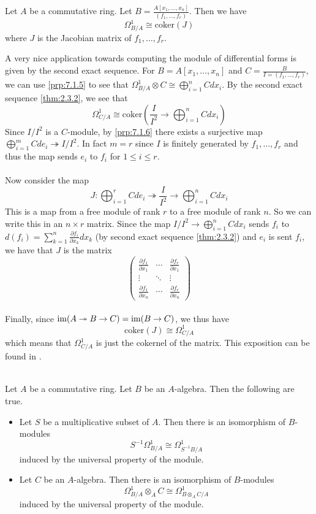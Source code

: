 \documentclass[a4paper]{article}
\begin{document}
\begin{eg}{}{} Let $A$ be a commutative ring. Let $B=\frac{A[x_1,\dots,x_n]}{(f_1,\dots,f_r)}$. Then we have $$\Omega_{B/A}^1\cong\text{coker}(J)$$ where $J$ is the Jacobian matrix of $f_1,\dots,f_r$. 
\end{eg}

A very nice application towards computing the module of differential forms is given by the second exact sequence. For $B=A[x_1,\dots,x_n]$ and $C=\frac{B}{I=(f_1,\dots,f_r)}$, we can use \ref{prp:7.1.5} to see that $\Omega_{B/A}^1\otimes C\cong\bigoplus_{i=1}^nCdx_i$. By the second exact sequence \ref{thm:2.3.2}, we see that $$\Omega_{C/A}^1\cong\text{coker}\left(\frac{I}{I^2}\to\bigoplus_{i=1}^nCdx_i\right)$$ Since $I/I^2$ is a $C$-module, by \ref{prp:7.1.6} there exists a surjective map $\bigoplus_{i=1}^mCde_i\twoheadrightarrow I/I^2$. In fact $m=r$ since $I$ is finitely generated by $f_1,\dots,f_r$ and thus the map sends $e_i$ to $f_i$ for $1\leq i\leq r$. \\~\\

Now consider the map $$J:\bigoplus_{i=1}^rCde_i\twoheadrightarrow\frac{I}{I^2}\rightarrow\bigoplus_{i=1}^nCdx_i$$ This is a map from a free module of rank $r$ to a free module of rank $n$. So we can write this in an $n\times r$ matrix. Since the map $I/I^2\to\bigoplus_{i=1}^nCdx_i$ sends $f_i$ to $d(f_i)=\sum_{k=1}^n\frac{\partial f_i}{\partial x_k}dx_k$ (by second exact sequence \ref{thm:2.3.2}) and $e_i$ is sent $f_i$, we have that $J$ is the matrix $$\begin{pmatrix}
\frac{\partial f_1}{\partial x_1} & \cdots & \frac{\partial f_r}{\partial x_1}\\
\vdots & \ddots & \vdots\\
\frac{\partial f_1}{\partial x_n} & \cdots & \frac{\partial f_r}{\partial x_n}
\end{pmatrix}$$~\\

Finally, since $\operatorname{im}(A\twoheadrightarrow B\to C)=\operatorname{im}(B\to C)$, we thus have $$\text{coker}(J)\cong\Omega_{C/A}^1$$ which means that $\Omega_{C/A}^1$ is just the cokernel of the matrix. This exposition can be found in \cite{Dav}. 

\begin{prp}{}{}\\
Let $A$ be a commutative ring. Let $B$ be an $A$-algebra. Then the following are true. 
\begin{itemize}
\item Let $S$ be a multiplicative subset of $A$. Then there is an isomorphism of $B$-modules $$S^{-1}\Omega_{B/A}^1\cong\Omega_{S^{-1}B/A}^1$$ induced by the universal property of the module. 
\item Let $C$ be an $A$-algebra. Then there is an isomorphism of $B$-modules $$\Omega_{B/A}^1\otimes_AC\cong\Omega_{B\otimes_AC/A}^1$$ induced by the universal property of the module. 
\end{itemize}
\end{prp}
\end{document}
